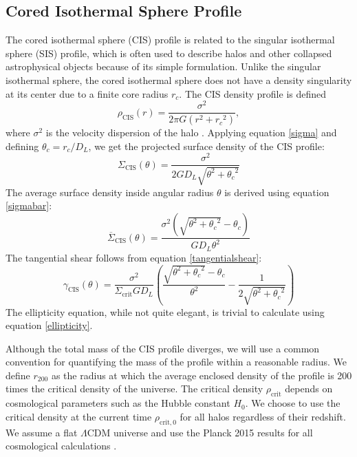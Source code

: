 \documentclass[10pt]{article}
\begin{document}
\subsection{Cored Isothermal Sphere Profile}
The cored isothermal sphere (CIS) profile is related to the singular isothermal sphere (SIS) profile, which is often used to describe halos and other collapsed astrophysical objects because of its simple formulation. Unlike the singular isothermal sphere, the cored isothermal sphere does not have a density singularity at its center due to a finite core radius $r_c$. The CIS density profile is defined
\begin{equation} \label{cisdensity}
\rho_\mathrm{CIS}(r) = \frac{\sigma^2}{2\pi G (r^2 + {r_c}^2)},
\end{equation}
where $\sigma^2$ is the velocity dispersion of the halo \citep{Chen2005, Shapiro1999}. Applying equation \ref{sigma} and defining $\theta_c = r_c/D_L$, we get the projected surface density of the CIS profile:
\begin{equation}
\Sigma_\mathrm{CIS}(\theta) = \frac{\sigma^2}{2 G D_L \sqrt{\theta^2 + {\theta_c}^2}}
\end{equation}
The average surface density inside angular radius $\theta$ is derived using equation \ref{sigmabar}:
\begin{equation}
\overline{\Sigma}_\mathrm{CIS}(\theta) = \frac{\sigma^2 \left(\sqrt{\theta^2 + {\theta_c}^2} - \theta_c \right)}{G D_L \theta^2}
\end{equation}
The tangential shear follows from equation \ref{tangentialshear}:
\begin{equation}
\gamma_\mathrm{CIS}(\theta) = \frac{\sigma^2}{\Sigma_\mathrm{crit} G D_L} \left(\frac{\sqrt{\theta^2 + {\theta_c}^2} - \theta_c}{\theta^2} - \frac{1}{2 \sqrt{\theta^2 + {\theta_c}^2}}\right)
\end{equation}
The ellipticity equation, while not quite elegant, is trivial to calculate using equation \ref{ellipticity}.

Although the total mass of the CIS profile diverges, we will use a common convention for quantifying the mass of the profile within a reasonable radius. We define $r_{200}$ as the radius at which the average enclosed density of the profile is 200 times the critical density of the universe. The critical density $\rho_\mathrm{crit}$ depends on cosmological parameters such as the Hubble constant $H_0$. We choose to use the critical density at the current time $\rho_\mathrm{crit,0}$ for all halos regardless of their redshift. We assume a flat $\Lambda$CDM universe and use the Planck 2015 results for all cosmological calculations \citep{PlanckCollaboration2015}.
\end{document}

